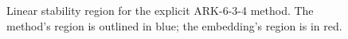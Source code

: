 \documentclass[letterpaper,10pt,english]{sphinxmanual}
\begin{document}
\begin{figure}[htbp]
\caption{Linear stability region for the explicit ARK-6-3-4 method.  The method's
region is outlined in blue; the embedding's region is in red.}\end{figure}
\end{document}
